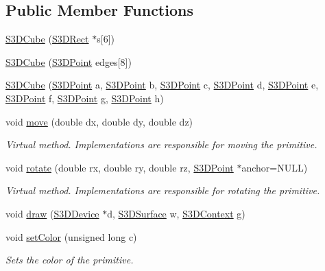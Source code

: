 \subsection*{Public Member Functions}
\begin{DoxyCompactItemize}
\item 
\hyperlink{class_s3_d_cube_a071b56f85b667b74d0056d0d554d3647}{S3DCube} (\hyperlink{class_s3_d_rect}{S3DRect} $\ast$s\mbox{[}6\mbox{]})
\item 
\hyperlink{class_s3_d_cube_a6bda81748dd5c23028611bf2863bcd69}{S3DCube} (\hyperlink{class_s3_d_point}{S3DPoint} edges\mbox{[}8\mbox{]})
\item 
\hyperlink{class_s3_d_cube_a96e5dcdd93eb3fcdcbadbce2f52e1890}{S3DCube} (\hyperlink{class_s3_d_point}{S3DPoint} a, \hyperlink{class_s3_d_point}{S3DPoint} b, \hyperlink{class_s3_d_point}{S3DPoint} c, \hyperlink{class_s3_d_point}{S3DPoint} d, \hyperlink{class_s3_d_point}{S3DPoint} e, \hyperlink{class_s3_d_point}{S3DPoint} f, \hyperlink{class_s3_d_point}{S3DPoint} g, \hyperlink{class_s3_d_point}{S3DPoint} h)
\item 
void \hyperlink{class_s3_d_cube_ab21a1988528297602452984f8a3c093e}{move} (double dx, double dy, double dz)
\begin{DoxyCompactList}\small\item\em Virtual method. Implementations are responsible for moving the primitive. \item\end{DoxyCompactList}\item 
void \hyperlink{class_s3_d_cube_a2e574649ca6ddd805c5ecdb7932f3ac1}{rotate} (double rx, double ry, double rz, \hyperlink{class_s3_d_point}{S3DPoint} $\ast$anchor=NULL)
\begin{DoxyCompactList}\small\item\em Virtual method. Implementations are responsible for rotating the primitive. \item\end{DoxyCompactList}\item 
void \hyperlink{class_s3_d_cube_a1e66a1dab7e99328fab61c2c86da7ba5}{draw} (\hyperlink{types_8h_a25c0773a29204332721bde1b164d0b84}{S3DDevice} $\ast$d, \hyperlink{types_8h_a4afc89c514af26434688c7e8b382ba5e}{S3DSurface} w, \hyperlink{types_8h_a46f30693e0040340e595d8228cc31779}{S3DContext} g)
\item 
void \hyperlink{class_s3_d_cube_a9c48875a16cc0ace3a3092e98663b785}{setColor} (unsigned long c)
\begin{DoxyCompactList}\small\item\em Sets the color of the primitive. \item\end{DoxyCompactList}\item 

\end{DoxyCompactItemize}
